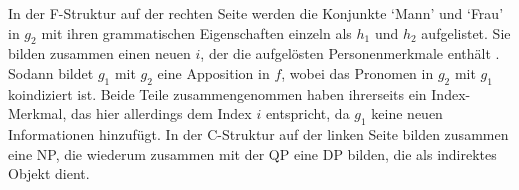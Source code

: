 In der F-Struktur auf der rechten Seite werden die
Konjunkte  `Mann' und  `Frau' in $g_2$ mit ihren
grammatischen Eigenschaften einzeln als $h_1$ und $h_2$ aufgelistet. Sie bilden
zusammen einen neuen  $i$, der die aufgelösten
Personenmerkmale enthält%
. Sodann bildet $g_1$ mit $g_2$ eine Apposition in $f$, wobei
das Pronomen  in $g_2$ mit $g_1$ koindiziert
ist. Beide Teile zusammengenommen haben ihrerseits ein Index-Merkmal, das hier
allerdings dem Index $i$ entspricht, da $g_1$ keine neuen Informationen
hinzufügt. In der C-Struktur auf der linken Seite
bilden  zusammen eine NP, die wiederum
zusammen mit der QP  eine
DP bilden, die als indirektes Objekt dient.

